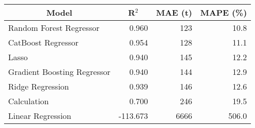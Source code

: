 
\begin{tabular}[t]{lrrr}
\toprule
\multicolumn{1}{c}{Model} & \multicolumn{1}{c}{R$^2$} & \multicolumn{1}{c}{MAE (t)} & \multicolumn{1}{c}{MAPE (\%)}\\
\midrule
Random Forest Regressor & 0.960 & 123 & 10.8\\
CatBoost Regressor & 0.954 & 128 & 11.1\\
Lasso & 0.940 & 145 & 12.2\\
Gradient Boosting Regressor & 0.940 & 144 & 12.9\\
Ridge Regression & 0.939 & 146 & 12.6\\
Calculation & 0.700 & 246 & 19.5\\
Linear Regression & -113.673 & 6666 & 506.0\\
\bottomrule
\end{tabular}
